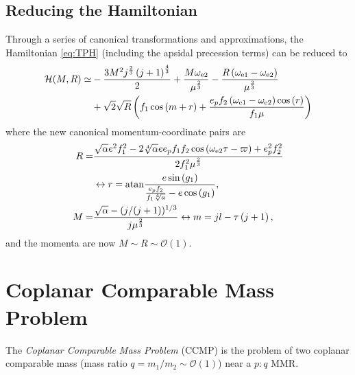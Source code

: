 \documentclass[usenatbib,twocolumn]{mnras}
\begin{document}
\subsection{Reducing the Hamiltonian}
Through a series of canonical transformations and approximations, the Hamiltonian \ref{eq:TPH} (including the apsidal precession terms) can be reduced to 
\begin{align}
    \mathcal H(M,R) \simeq& - \frac{3 M^{2} j^{\frac{2}{3}} \left(j + 1\right)^{\frac{4}{3}}}{2} + \frac{M \omega_{{\rm e}2}}{\mu^{\frac{2}{3}}} 
    - \frac{R \left( \omega_{{\rm e}1} - \omega_{{\rm e}2}\right)}{\mu^{\frac{2}{3}}}
    \nonumber\\
    &+ \sqrt{2} \sqrt{R} \left(f_{1} \cos{\left(m + r \right)}
        +\frac{e_{p} f_{2} \left(\omega_{{\rm e}1} - \omega_{{\rm e}2}\right) \cos{\left(r \right)}}{f_{1} \mu}\right)
\end{align}
where the new canonical momentum-coordinate pairs are
\begin{align}
    R =& \frac{\sqrt{\alpha} e^{2} f_{1}^{2} - 2 \sqrt[4]{\alpha} e e_{p} f_{1} f_{2} \cos{\left(\omega_{{\rm e}2} \tau - \varpi \right)} + e_{p}^{2} f_{2}^{2}}{2 f_{1}^{2} \mu^{\frac{2}{3}}}\\
    &\leftrightarrow r = \mathrm{atan}\frac{e \sin{\left(g_{1} \right)}}{ \frac{e_{p} f_{2}}{f_{1} \sqrt[4]{a}}- e \cos{\left(g_{1} \right)}},\\
    M=&\frac{\sqrt{\alpha}- (j/(j+1))^{1/3} }{j \mu^{\frac{2}{3}}}
    \leftrightarrow m =  j l - \tau \left(j + 1\right),
\end{align}
and the momenta are now $M\sim R \sim\mathcal O(1)$.


\section{Coplanar Comparable Mass Problem}
The \emph{Coplanar Comparable Mass Problem} (CCMP) is the problem of two coplanar comparable mass (mass ratio $q=m_1/m_2\sim\mathcal O(1)$) near a $p:q$ MMR.
\end{document}
